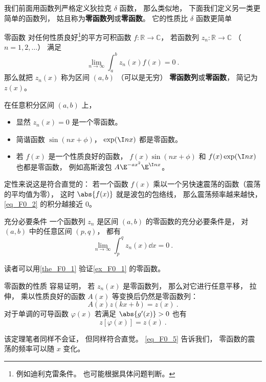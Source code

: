 
我们前面用函数列严格定义狄拉克 $\delta$ 函数， 那么类似地， 下面我们定义另一类更简单的函数列， 姑且称为\textbf{零函数列}或\textbf{零函数}。 它的性质比 $\delta$ 函数更简单
\begin{definition}{零函数}
对任何性质良好\footnote{例如迪利克雷条件。 也可能根据具体问题判断。}的平方可积函数 $f: \mathbb R \to \mathbb C$， 若函数列 $z_n: \mathbb R \to \mathbb C$ （$n = 1, 2, \dots$） 满足
\begin{equation}\label{eq_F0_2}
\lim_{n\to \infty}\int_{a}^{b} z_n(x) f(x) = 0~.
\end{equation}
那么就把 $z_n(x)$ 称为区间 $(a,b)$ （可以是无穷） \textbf{零函数列}或\textbf{零函数}， 简记为 $z(x)$。
\end{definition}

\begin{example}{}\label{ex_F0_1}
在任意积分区间 $(a,b)$ 上，
\begin{itemize}
\item 显然 $z_n(x) = 0$ 是一个零函数。
\item 简谐函数 $\sin(nx + \phi)$， $\exp(\I n x)$ 都是零函数。
\item 若 $f(x)$ 是一个性质良好的函数， $f(x)\sin(nx + \phi)$ 和 $f(x)\exp(\I n x)$ 也都是零函数， 例如高斯波包 $A\E^{-ax^2}\E^{\I nx}$。
\end{itemize}

定性来说这是符合直觉的： 若一个函数 $f(x)$ 乘以一个另快速震荡的函数（震荡的平均值为零）， 这时 $\abs{f(x)}$ 就是波包的包络线， 那么震荡频率越来越快， \autoref{eq_F0_2} 的积分越接近 $0$。
\end{example}

\begin{theorem}{充分必要条件}\label{the_F0_1}
一个函数列 $z_n$ 是区间 $(a, b)$ 的零函数的充分必要条件是， 对 $(a, b)$ 中的任意区间 $(p, q)$， 都有
\begin{equation}
\lim_{n\to\infty}\int_p^q z_n(x) \dd{x} = 0~.
\end{equation}
\end{theorem}
读者可以用\autoref{the_F0_1} 验证\autoref{ex_F0_1} 的零函数。

\begin{theorem}{零函数的性质}
容易证明， 若 $z_n(x)$ 是零函数列， 那么对它进行任意平移， 拉伸， 乘以性质良好的函数 $A(x)$ 等变换后仍然是零函数列：
\begin{equation}
A(x) z(kx + b) = z(x)~.
\end{equation}
对于单调的可导函数 $\varphi(x)$ 若满足 $\abs{g'(x)} > 0$ 也有
\begin{equation}\label{eq_F0_5}
z[\varphi(x)] = z(x)~.
\end{equation}
\end{theorem}
该定理笔者同样不会证， 但同样符合直觉。 \autoref{eq_F0_5} 告诉我们， 零函数的震荡的频率可以随 $x$ 变化。

